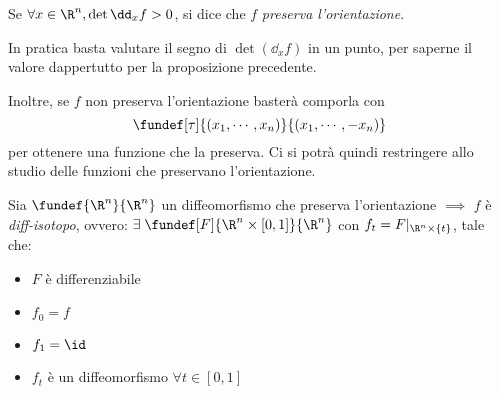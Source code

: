 \begin{defn}
Se $\forall x \in \R^n, \det \dd_xf > 0$, si dice che $f$ \emph{preserva l'orientazione}.
\end{defn}

\begin{oss}
In pratica basta valutare il segno di $\det (\dd_xf)$ in un punto, per saperne il valore dappertutto per la proposizione precedente.

Inoltre, se $f$ non preserva l'orientazione basterà comporla con
\begin{equation*}
\fundef[\tau]{(x_1,\cdots,x_n)}{(x_1,\cdots,-x_n)}
\end{equation*}
per ottenere una funzione che la preserva. Ci si potrà quindi restringere allo studio delle funzioni che preservano l'orientazione.
\end{oss}

\begin{teo}
Sia $\fundef{\R^n}{\R^n}$ un diffeomorfismo che preserva l'orientazione $\implies$ $f$ è \emph{diff-isotopo}, ovvero:
$\exists \; \fundef[F]{\R^n \times [0,1]}{\R^n}$ con $f_t = F|_{\R^n \times \{t\}}$, tale che:
\begin{itemize}
\item $F$ è differenziabile
\item $f_0=f$
\item $f_1 = \id$
\item $f_t$ è un diffeomorfismo $\forall t \in [0,1]$
\end{itemize}
\end{teo}

